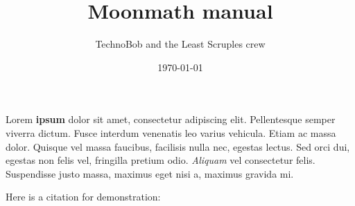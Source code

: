 \documentclass[a4paper, 12pt]{book}
\title{Moonmath manual}
\author{TechnoBob and the Least Scruples crew}
\date{\today}
\theoremstyle{plain}
\begin{document}
\maketitle

Lorem \textbf{ipsum} dolor sit amet, consectetur adipiscing elit. Pellentesque semper viverra dictum.  Fusce interdum venenatis leo varius vehicula. Etiam ac massa dolor. Quisque vel massa faucibus, facilisis nulla nec, egestas lectus. Sed orci dui, egestas non felis vel, fringilla pretium odio. \textit{Aliquam} vel consectetur felis. Suspendisse justo massa, maximus eget nisi a, maximus gravida mi.

Here is a citation for demonstration: \cite{lamport1982the}








\end{document}
